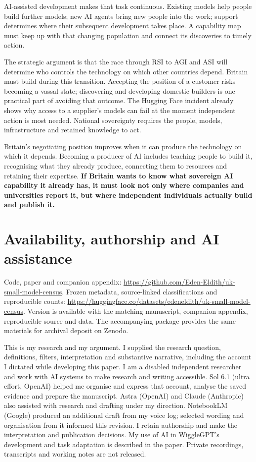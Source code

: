 \documentclass[11pt,a4paper]{article}
\begin{document}
AI-assisted development makes that task continuous. Existing models help
people build further models; new AI agents bring new people into the work;
support determines where their subsequent development takes place. A
capability map must keep up with that changing population and connect its
discoveries to timely action.

The strategic argument is that the race through RSI to AGI and ASI will
determine who controls the technology on which other countries depend.
Britain must build during this transition. Accepting the position of a
customer risks becoming a vassal state; discovering and developing domestic
builders is one practical part of avoiding that outcome. The Hugging Face
incident already shows why access to a supplier's models can fail at the
moment independent action is most needed. National sovereignty requires
the people, models, infrastructure and retained knowledge to act.

\begin{samepage}
Britain's negotiating position improves when it can produce the technology
on which it depends. Becoming a producer of AI includes teaching people
to build it, recognising what they already produce, connecting them to
resources and retaining their expertise. \textbf{If Britain wants to know what sovereign AI capability it already has, it must look not only where companies and universities report it, but where independent individuals actually build and publish it.}\par
\end{samepage}

\section*{Availability, authorship and AI assistance}
Code, paper and companion appendix:
\url{https://github.com/Eden-Eldith/uk-small-model-census}.
Frozen metadata, source-linked classifications and reproducible counts:
\url{https://huggingface.co/datasets/edeneldith/uk-small-model-census}.
Version \CensusVersion{} is available with the matching manuscript,
companion appendix, reproducible source and data. The accompanying
package provides the same materials for archival deposit on Zenodo.

This is my research and my argument. I supplied the research question,
definitions, filters, interpretation and substantive narrative, including
the account I dictated while developing this paper. I am a disabled
independent researcher and work with AI systems to make research and writing accessible.
Sol 6.1 (ultra effort, OpenAI) helped me organise and express that account,
analyse the saved evidence and prepare the manuscript. Astra (OpenAI) and
Claude (Anthropic) also assisted with research and drafting under my
direction. NotebookLM (Google) produced an additional draft from my voice
log; selected wording and organisation from it informed this revision.
I retain authorship and make the interpretation and publication
decisions. My use of AI in WiggleGPT's development and task adaptation is
described in the paper. Private recordings, transcripts and working notes
are not released.
\printbibliography[heading=bibintoc]
\end{document}
